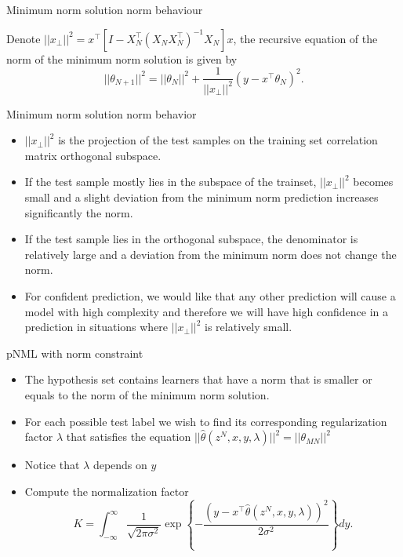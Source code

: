 \documentclass[aspectratio=169]{beamer}
\begin{document}
\begin{frame}{Minimum norm solution norm behaviour}
\begin{theorem}
Denote $||x_\bot||^2 = x^\top \left[I - X_N^\top (X_N X_N^\top )^{-1} X_N \right] x$,
the recursive equation of the norm of the minimum norm solution is given by 
\begin{equation}  \label{eq:mn_solution_norm}
||\theta_{N+1}||^2 = ||\theta_N||^2 + \frac{1}{||x_\bot||^2}(y-x^\top \theta_N)^2.
\end{equation}
\end{theorem}
\end{frame}

\begin{frame}{Minimum norm solution norm behavior}
\begin{itemize}
\setlength\itemsep{1em}
    \item $||x_\bot||^2$ is the projection of the test samples on the training set correlation matrix orthogonal subspace.
    \item If the test sample mostly lies in the subspace of the trainset, $||x_\bot||^2$ becomes small and a slight deviation from the minimum norm prediction increases significantly the norm.
    \item If the test sample lies in the orthogonal subspace, the denominator is relatively large and a deviation from the minimum norm does not change the norm.
    \item For confident prediction, we would like that any other prediction will cause a model with high complexity and therefore we will have high confidence in a prediction in situations where $||x_\bot||^2$ is relatively small.
\end{itemize}
\end{frame}

\begin{frame}{pNML with norm constraint}
\begin{itemize}
\item  The hypothesis set contains learners that have a norm that is smaller or equals to the norm of the minimum norm solution.
\item For each possible test label we wish to find its corresponding regularization factor $\lambda$ that satisfies the equation
$||\hat{\theta}(z^N,x,y,\lambda)||^2 = ||\theta_{MN}||^2$ 
\item Notice that $\lambda$ depends on $y$
\item Compute the normalization factor
    \begin{equation}
    K
    = 
    \int_{-\infty}^\infty
    \frac{1}{\sqrt{2 \pi \sigma^2}} \exp \left\{-
    \frac{\left(y- x^\top \hat{\theta}(z^N,x,y,\lambda) \right)^2}{2 \sigma^2} \right\} dy.
    \end{equation}
\end{itemize}
\end{frame}
\end{document}
